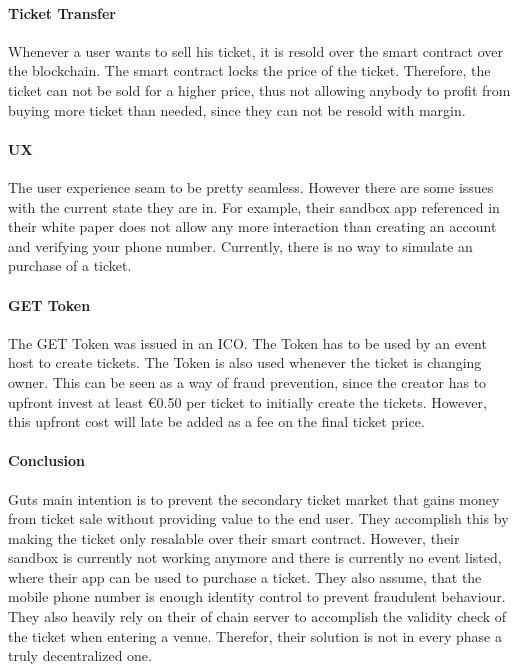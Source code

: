 \paragraph{Ticket Transfer}
Whenever a user wants to sell his ticket, it is resold over the smart contract over the blockchain. The smart contract locks the price of the ticket. Therefore, the ticket can not be sold for a higher price, thus not allowing anybody to profit from buying more ticket than needed, since they can not be resold with margin.


\paragraph{UX}
The user experience seam to be pretty seamless. However there are some issues with the current state they are in. For example, their sandbox app referenced in their white paper does not allow any more interaction than creating an account and verifying your phone number. Currently, there is no way to simulate an purchase of a ticket.


\paragraph{GET Token}
The GET Token was issued in an ICO. The Token has to be used by an event host to create tickets. The Token is also used whenever the ticket is changing owner. This can be seen as a way of fraud prevention, since the creator has to upfront invest at least \euro0.50 per ticket to initially create the tickets. However, this upfront cost will late be added as a fee on the final ticket price.


\paragraph{Conclusion}
Guts main intention is to prevent the secondary ticket market that gains money from ticket sale without providing value to the  end user. They accomplish this by making the ticket only resalable over their smart contract. However, their sandbox is currently not working anymore and there is currently no event listed, where their app can be used to purchase a ticket. They also assume, that the mobile phone number is enough identity control to prevent fraudulent behaviour. They also heavily rely on their of chain server to accomplish the validity check of the ticket when entering a venue. Therefor, their solution is not in every phase a truly decentralized one.
